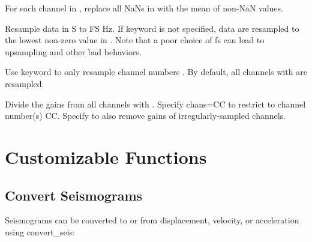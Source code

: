 \documentclass[letterpaper,11pt,english]{sphinxmanual}
\begin{document}
For each channel  in , replace all NaNs in  with the mean
of non-NaN values.


\begin{fulllineitems}
\end{fulllineitems}



\begin{fulllineitems}
\end{fulllineitems}


Resample data in S to FS Hz. If keyword  is not specified, data are
resampled to the lowest non-zero value in . Note that a poor choice
of fs can lead to upsampling and other bad behaviors.

Use keyword  to only resample channel numbers . By default,
all channels  with  are resampled.


\begin{fulllineitems}
\end{fulllineitems}


Divide the gains from all channels  with . Specify
chans=CC to restrict to channel number(s) CC. Specify  to also
remove gains of irregularly-sampled channels.


\section{Customizable Functions}
\label{\detokenize{src/Processing/processing:customizable-functions}}

\subsection{Convert Seismograms}
\label{\detokenize{src/Processing/processing:convert-seismograms}}
Seismograms can be converted to or from displacement, velocity, or acceleration
using convert\_seis:


\begin{fulllineitems}
\end{fulllineitems}
\end{document}
